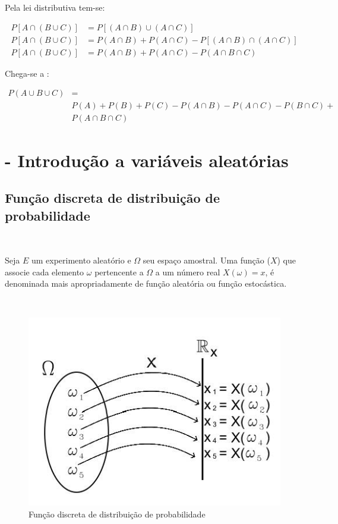\documentclass[
]{book}
\begin{document}
\hfill\break

Pela lei distributiva tem-se:

\hfill\break

\begin{align*}
P [A \cap (B \cup C)] & = P[ (A \cap B) \cup (A \cap C )  ]\\
P [A \cap (B \cup C)] & = P(A \cap B) + P(A \cap C) - P[ ( A \cap B) \cap (A \cap C)] \\
P [A \cap (B \cup C)] & = P(A \cap B) + P(A \cap C) - P( A \cap B \cap C)
\end{align*}

\hfill\break

Chega-se a :

\begin{align*}
P( A \cup B \cup C ) & = \\
                     & P(A) + P(B) +P(C) - P(A \cap B) - P(A \cap C) - P(B \cap C)  +\\
                     & P(A \cap B \cap C)
\end{align*}

\hypertarget{var_aleatoria}{%
\chapter{- Introdução a variáveis aleatórias}\label{var_aleatoria}}

\hypertarget{funuxe7uxe3o-discreta-de-distribuiuxe7uxe3o-de-probabilidade}{%
\section{Função discreta de distribuição de probabilidade}\label{funuxe7uxe3o-discreta-de-distribuiuxe7uxe3o-de-probabilidade}}

~

Seja \(E\) um experimento aleatório e \(\Omega\) seu espaço amostral. Uma função (\(X\)) que associe cada elemento \(\omega\) pertencente a \(\Omega\) a um número real \(X(\omega)=x\), é denominada mais apropriadamente de função aleatória ou função estocástica.

~

\begin{figure}

{\centering \includegraphics[width=0.6\linewidth]{images5/v_aleatoria} 

}

\caption{Função discreta de distribuição de probabilidade}\label{fig:unnamed-chunk-77}
\end{figure}
\end{document}
